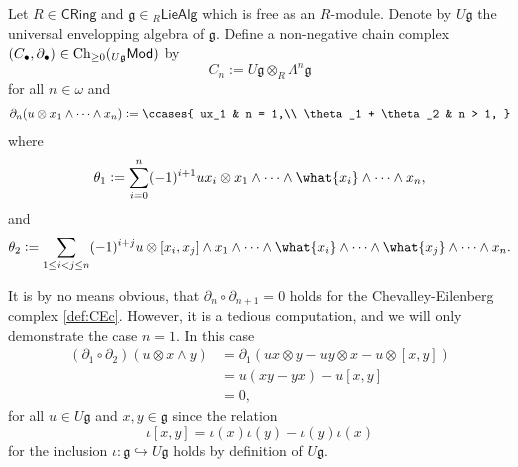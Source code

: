 \begin{definition}
	\label{def:CEc}
	Let $R \in \mathsf{CRing}$ and $\mathfrak{g} \in {_{R}}\mathsf{LieAlg}$ which is free as an $R$-module. Denote by $U\mathfrak{g}$ the universal envelopping algebra of $\mathfrak{g}$. Define a non-negative chain complex $(C_\bullet,\partial_\bullet) \in \operatorname{Ch}_{\geq 0}({_{U\mathfrak{g}}}\mathsf{Mod})$ by
	\begin{equation*}
		C_n := U\mathfrak{g} \otimes_R\Lambda^n \mathfrak{g}
	\end{equation*}
	\noindent for all $n \in \omega$ and
	\begin{align*}
		\partial_n(u \otimes x_1 \wedge \dots \wedge x_n) := \ccases{
			ux_1 & n = 1,\\
			\theta_1 + \theta_2 & n > 1,
		}
	\end{align*}
	\noindent where
	\begin{equation*}
		\theta_1 := \sum_{i = 0}^n (-1)^{i + 1} ux_i \otimes x_1 \wedge \dots \wedge \what{x_i} \wedge \dots \wedge x_n,
	\end{equation*}
	\noindent and
	\begin{equation*}
		\theta_2 := \sum_{1 \leq i < j \leq n} (-1)^{i + j} u \otimes [x_i,x_j] \wedge x_1 \wedge \dots \wedge \what{x_i} \wedge \dots \wedge \what{x_j} \wedge \dots \wedge x_n.
	\end{equation*}
\end{definition}

\begin{remark}
	It is by no means obvious, that $\partial_n \circ \partial_{n + 1} = 0$ holds for the Chevalley-Eilenberg complex \ref{def:CEc}. However, it is a tedious computation, and we will only demonstrate the case $n = 1$. In this case
	\begin{align*}
		(\partial_1 \circ \partial_2)(u \otimes x \wedge y) &= \partial_1(ux \otimes y - uy \otimes x - u \otimes [x,y])\\
		&= u(xy - yx) - u[x,y]\\
		&= 0,
	\end{align*}
	\noindent for all $u \in U\mathfrak{g}$ and $x,y \in \mathfrak{g}$ since the relation
	\begin{equation*}
		\iota[x,y] = \iota(x)\iota(y) - \iota(y)\iota(x)
	\end{equation*}
	\noindent for the inclusion $\iota : \mathfrak{g} \hookrightarrow U\mathfrak{g}$ holds by definition of $U\mathfrak{g}$.
\end{remark}

